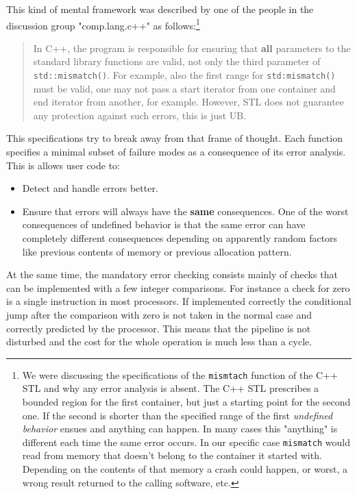 \documentclass[12pt,a4paper]{memoir} %
\begin{document}
This kind of mental framework was described by one of the people in the discussion group "comp.lang.c++" as follows:\footnote{We were discussing 
the specifications of the \texttt{mismtach} function of the C++ STL and why any error analysis is absent. The C++ STL prescribes a bounded 
region for the first container, but just a starting point for the second one. If the second is shorter than the specified range of the first
 \textsl{undefined behavior} ensues and anything can happen. In many cases this "anything" is different each time the same error occurs. In our
specific case \texttt{mismatch} would read from memory that doesn't belong to the container it started with. Depending on the contents of
that memory a crash could happen, or worst, a wrong result returned to the calling software, etc.}
\begin{quotation}
 In C++, the program is responsible for ensuring that \textbf{all} parameters to
 the standard library functions are valid, not only the third parameter of
 \texttt{std::mismatch()}. For example, also the first range for \texttt{std:mismatch()}
 must be valid, one may not pass a start iterator from one container and
 end iterator from another, for example. However, STL does not guarantee
 any protection against such errors, this is just UB.
\end{quotation}
This specifications try to break away from that frame of thought. Each function specifies a minimal subset of failure modes as a consequence of its error analysis. This 
is allows user code to:
\begin{itemize}
\item Detect and handle errors better.
\item Ensure that errors will always have the \textbf{same} consequences. One of the worst consequences of undefined behavior is that the same error can 
have completely different consequences depending on apparently random factors like previous contents of memory or previous allocation pattern.
\end{itemize}

At the same time, the mandatory error checking consists mainly of checks that can be implemented with a few integer comparisons. For instance a check 
for zero is a single instruction in most processors. If implemented correctly the conditional jump after the comparison with zero is not taken in the 
normal case and correctly predicted by the processor. This means that the pipeline is not disturbed and the cost for the whole operation is much less than a cycle.
\end{document}
